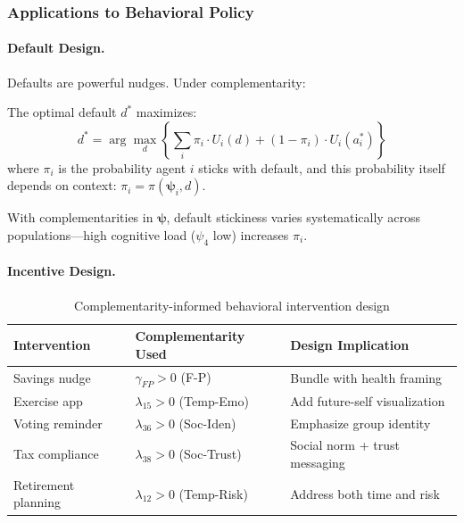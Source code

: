\subsubsection{Applications to Behavioral Policy}

\paragraph{Default Design.}

Defaults are powerful nudges. Under complementarity:

\begin{proposition}
\label{prop:optimal-default}
The optimal default $d^*$ maximizes:
\begin{equation}
d^* = \arg\max_d \left\{ \sum_{i} \pi_i \cdot U_i(d) + (1-\pi_i) \cdot U_i(a_i^*) \right\}
\end{equation}
where $\pi_i$ is the probability agent $i$ sticks with default, and this probability 
itself depends on context: $\pi_i = \pi(\boldsymbol{\psi}_i, d)$.
\end{proposition}

With complementarities in $\boldsymbol{\psi}$, default stickiness varies systematically 
across populations---high cognitive load ($\psi_4$ low) increases $\pi_i$.

\paragraph{Incentive Design.}

\begin{table}[h]
\centering
\small
\begin{tabular}{p{3cm}p{4cm}p{5cm}}
\toprule
\textbf{Intervention} & \textbf{Complementarity Used} & \textbf{Design Implication} \\
\midrule
Savings nudge & $\gamma_{FP} > 0$ (F-P) & Bundle with health framing \\
Exercise app & $\lambda_{15} > 0$ (Temp-Emo) & Add future-self visualization \\
Voting reminder & $\lambda_{36} > 0$ (Soc-Iden) & Emphasize group identity \\
Tax compliance & $\lambda_{38} > 0$ (Soc-Trust) & Social norm + trust messaging \\
Retirement planning & $\lambda_{12} > 0$ (Temp-Risk) & Address both time and risk \\
\bottomrule
\end{tabular}
\caption{Complementarity-informed behavioral intervention design}
\label{tab:intervention-design}
\end{table}

